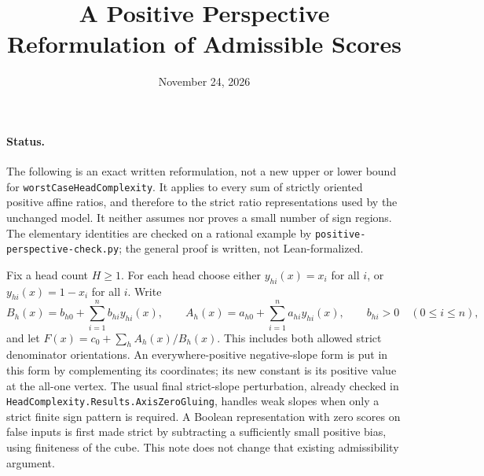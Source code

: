 \documentclass[11pt]{article}
\title{A Positive Perspective Reformulation of Admissible Scores}
\author{}
\date{November 24, 2026}
\begin{document}
\maketitle

\paragraph{Status.}
The following is an exact written reformulation, not a new upper or lower
bound for \texttt{worstCaseHeadComplexity}. It applies to every sum of
strictly oriented positive affine ratios, and therefore to the strict
ratio representations used by the unchanged model. It neither assumes
nor proves a small number of sign regions. The elementary identities
are checked on a rational example by
\texttt{positive-perspective-check.py}; the general proof is written,
not Lean-formalized.

Fix a head count $H\geq1$. For each head choose either $y_{hi}(x)=x_i$
for all $i$, or $y_{hi}(x)=1-x_i$ for all $i$. Write
\[
 B_h(x)=b_{h0}+\sum_{i=1}^n b_{hi}y_{hi}(x),\qquad
 A_h(x)=a_{h0}+\sum_{i=1}^n a_{hi}y_{hi}(x),\qquad
 b_{hi}>0\quad(0\leq i\leq n),
\]
and let $F(x)=c_0+\sum_h A_h(x)/B_h(x)$. This includes both allowed
strict denominator orientations. An everywhere-positive negative-slope
form is put in this form by complementing its coordinates; its new
constant is its positive value at the all-one vertex. The usual final
strict-slope perturbation, already checked in
\texttt{HeadComplexity.Results.AxisZeroGluing}, handles weak slopes when
only a strict finite sign pattern is required. A Boolean representation
with zero scores on false inputs is first made strict by subtracting a
sufficiently small positive bias, using finiteness of the cube. This note does not change
that existing admissibility argument.
\end{document}
